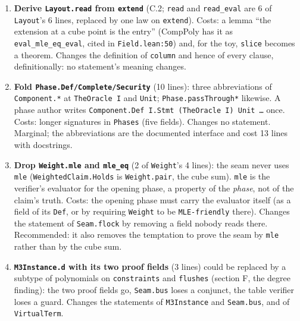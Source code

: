 \begin{enumerate}
\item \textbf{Derive \texttt{Layout.\allowbreak{}read} from \texttt{extend}} (C.2; \texttt{read} and \texttt{read\_\allowbreak{}eval} are 6 of \texttt{Layout}'s 6 lines, replaced by one law on \texttt{extend}). Costs: a lemma \enquote{the extension at a cube point is the entry} (CompPoly has it as \texttt{eval\_\allowbreak{}mle\_\allowbreak{}eq\_\allowbreak{}eval}, cited in \texttt{Field.\allowbreak{}lean:50}) and, for the toy, \texttt{slice} becomes a theorem. Changes the definition of \texttt{column} and hence of every clause, definitionally: no statement's meaning changes.
\item \textbf{Fold \texttt{Phase.\allowbreak{}Def/\allowbreak{}Complete/\allowbreak{}Security}} (10 lines): three abbreviations of \texttt{Component.\allowbreak{}*} at \texttt{TheOracle I} and \texttt{Unit}; \texttt{Phase.\allowbreak{}passThrough*} likewise. A phase author writes \texttt{C\allowbreak{}o\allowbreak{}m\allowbreak{}p\allowbreak{}o\allowbreak{}n\allowbreak{}e\allowbreak{}n\allowbreak{}t\allowbreak{}.\allowbreak{}D\allowbreak{}e\allowbreak{}f\allowbreak{} I\allowbreak{}.\allowbreak{}S\allowbreak{}t\allowbreak{}m\allowbreak{}t\allowbreak{} (\allowbreak{}T\allowbreak{}h\allowbreak{}e\allowbreak{}O\allowbreak{}r\allowbreak{}a\allowbreak{}c\allowbreak{}l\allowbreak{}e\allowbreak{} I\allowbreak{})\allowbreak{} U\allowbreak{}n\allowbreak{}i\allowbreak{}t\allowbreak{} …} once. Costs: longer signatures in \texttt{Phases} (five fields). Changes no statement. Marginal; the abbreviations are the documented interface and cost 13 lines with docstrings.
\item \textbf{Drop \texttt{Weight.\allowbreak{}mle} and \texttt{mle\_\allowbreak{}eq}} (2 of \texttt{Weight}'s 4 lines): the seam never uses \texttt{mle} (\texttt{WeightedClaim.\allowbreak{}Holds} is \texttt{Weight.\allowbreak{}pair}, the cube sum). \texttt{mle} is the verifier's evaluator for the opening phase, a property of the \emph{phase}, not of the claim's truth. Costs: the opening phase must carry the evaluator itself (as a field of its \texttt{Def}, or by requiring \texttt{Weight} to be \texttt{MLE-{}friendly} there). Changes the statement of \texttt{Seam.\allowbreak{}flock} by removing a field nobody reads there. Recommended: it also removes the temptation to prove the seam by \texttt{mle} rather than by the cube sum.
\item \textbf{\texttt{M3Instance.\allowbreak{}d} with its two proof fields} (3 lines) could be replaced by a subtype of polynomials on \texttt{constraints} and \texttt{flushes} (section F, the degree finding): the two proof fields go, \texttt{Seam.\allowbreak{}bus} loses a conjunct, the table verifier loses a guard. Changes the statements of \texttt{M3Instance} and \texttt{Seam.\allowbreak{}bus}, and of \texttt{VirtualTerm}.

\end{enumerate}
